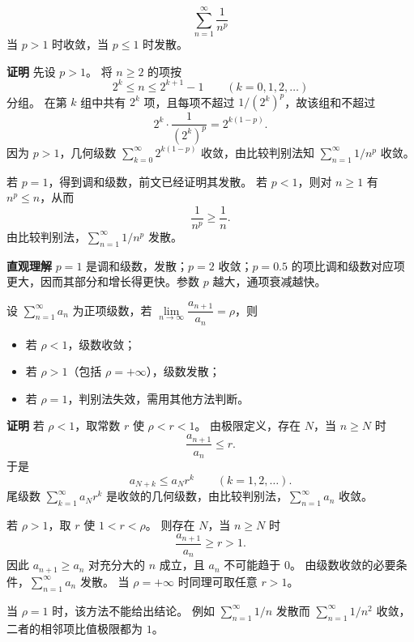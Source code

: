 \documentclass[fontset=fandol]{ctexart}
\newenvironment{custom}[1]{\par\noindent\textbf{#1}\quad}{\par\vspace{0.8em}}
\newenvironment{intuition}{\par\noindent\textbf{直观理解}\quad}{\par\vspace{0.8em}}
\begin{document}
\begin{example}[\(p\)-级数]
\[
\sum_{n=1}^{\infty} \dfrac{1}{n^p}
\]
当 \(p > 1\) 时收敛，当 \(p \leq 1\) 时发散。
\end{example}

\begin{custom}{证明}
先设 $p>1$。 将 $n\ge2$ 的项按
\[
2^k\le n\le 2^{k+1}-1\qquad(k=0,1,2,\ldots)
\]
分组。 在第 $k$ 组中共有 $2^k$ 项，且每项不超过 $1/(2^k)^p$，故该组和不超过
\[
2^k\cdot \frac{1}{(2^k)^p}=2^{k(1-p)}.
\]
因为 $p>1$，几何级数 $\sum\limits_{k = 0}^{  \infty }2^{k(1-p)}$ 收敛，由比较判别法知 $\sum\limits_{n = 1}^{  \infty } 1/n^p$ 收敛。

若 $p=1$，得到调和级数，前文已经证明其发散。 若 $p<1$，则对 $n\ge1$ 有 $n^p\le n$，从而
\[
\frac1{n^p}\ge \frac1n.
\]
由比较判别法，$\sum\limits_{n = 1}^{  \infty } 1/n^p$ 发散。
\end{custom}

\begin{intuition}
\(p=1\) 是调和级数，发散；\(p=2\) 收敛；\(p=0.5\) 的项比调和级数对应项更大，因而其部分和增长得更快。参数 \(p\) 越大，通项衰减越快。
\end{intuition}

\begin{theorem}
设 \(\sum\limits_{n = 1}^{  \infty }a_n\) 为正项级数，若 \(\lim\limits_{n\to\infty}\dfrac{a_{n+1}}{a_n}=\rho\)，则
\begin{itemize}
\item 若 \(\rho < 1\)，级数收敛；
\item 若 \(\rho > 1\)（包括 \(\rho = +\infty\)），级数发散；
\item 若 \(\rho = 1\)，判别法失效，需用其他方法判断。
\end{itemize}
\end{theorem}

\begin{custom}{证明}
若 $\rho<1$，取常数 $r$ 使 $\rho<r<1$。 由极限定义，存在 $N$，当 $n\ge N$ 时
\[
\frac{a_{n+1}}{a_n}\le r.
\]
于是
\[
a_{N+k}\le a_N r^k\qquad(k=1,2,\ldots).
\]
尾级数 $\sum\limits_{k = 1}^{  \infty }a_N r^k$ 是收敛的几何级数，由比较判别法，$\sum\limits_{n = 1}^{  \infty } a_n$ 收敛。

若 $\rho>1$，取 $r$ 使 $1<r<\rho$。 则存在 $N$，当 $n\ge N$ 时
\[
\frac{a_{n+1}}{a_n}\ge r>1.
\]
因此 $a_{n+1}\ge a_n$ 对充分大的 $n$ 成立，且 $a_n$ 不可能趋于 $0$。 由级数收敛的必要条件，$\sum\limits_{n = 1}^{  \infty } a_n$ 发散。 当 $\rho=+\infty$ 时同理可取任意 $r>1$。

当 $\rho=1$ 时，该方法不能给出结论。 例如 $\sum\limits_{n = 1}^{  \infty } 1/n$ 发散而 $\sum\limits_{n = 1}^{  \infty } 1/n^2$ 收敛，二者的相邻项比值极限都为 $1$。
\end{custom}
\end{document}
